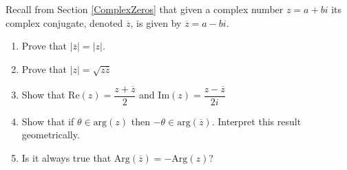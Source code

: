 { Recall from Section \ref{ComplexZeros} that given a complex number $z = a+bi$ its complex conjugate, denoted $\overline{z}$, is given by $\overline{z} = a - bi$.
\begin{enumerate} 
\item Prove that $\left| \overline{z} \right| = |z|$. 
\item Prove that $|z| = \sqrt{z \overline{z}}$ 
\item  Show that $\text{Re}(z) = \dfrac{z + \overline{z}}{2}$ and $\text{Im}(z) = \dfrac{z - \overline{z}}{2i}$ 
\item  Show that if $\theta \in \text{arg}(z)$ then $-\theta \in \text{arg}\left(\overline{z}\right)$. Interpret this result geometrically. 
\item  Is it always true that $\text{Arg}\left(\overline{z}\right) = -\text{Arg}(z)$?
\end{enumerate}}
{}
